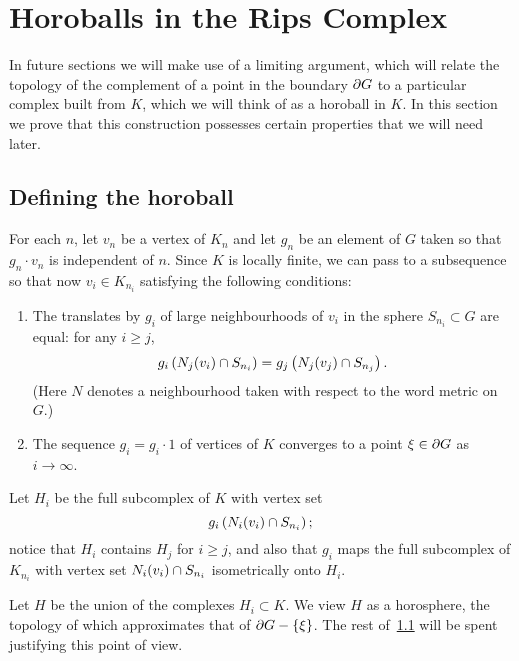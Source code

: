 \documentclass[a4paper]{article}
\begin{document}
\section{Horoballs in the Rips Complex}

In future sections we will make use of a limiting argument, which will relate
the topology of the complement of a point in the boundary $\partial G$ to a
particular complex built from $K$, which we will think of as a horoball in $K$.
In this section we prove that this construction possesses certain properties
that we will need later.

\subsection{Defining the horoball}\label{sec:horoball}

For each $n$, let $v_n$ be a vertex of $K_n$ and let $g_n$ be an element of $G$
taken so that $g_n\cdot v_n$ is independent of $n$.  Since $K$ is locally
finite, we can pass to a subsequence so that now $v_i \in K_{n_i}$ satisfying
the following conditions:
\begin{enumerate}
  \item
    The translates by $g_i$ of large neighbourhoods of $v_i$ in the sphere
    $S_{n_i} \subset G$ are equal: for any $i \geq j$,
    \begin{equation*}
      g_i\left(N_j(v_i) \cap S_{n_i}\right) 
            = g_j\left(N_j(v_j) \cap S_{n_j}\right).
    \end{equation*}
    (Here $N$ denotes a neighbourhood taken with respect to the word metric on
    $G$.)
  \item
    The sequence $g_i = g_i\cdot 1$ of vertices of $K$ converges to a point
    $\xi \in \partial G$ as $i\to\infty$.
\end{enumerate}

Let $H_i$ be the full subcomplex of $K$ with vertex set
\begin{equation*}
  g_i\left(N_i(v_i) \cap S_{n_i}\right);
\end{equation*}
notice that $H_i$ contains $H_j$ for $i \geq j$, and also that $g_i$ maps the
full subcomplex of $K_{n_i}$ with vertex set $N_i(v_i) \cap S_{n_i}$
isometrically onto $H_i$. 

Let $H$ be the union of the complexes $H_i \subset K$. We view $H$ as a
horosphere, the topology of which approximates that of $\partial G - \left\{\xi\right\}$.
The rest of~\ref{sec:horoball} will be spent justifying this point of view.
\end{document}
